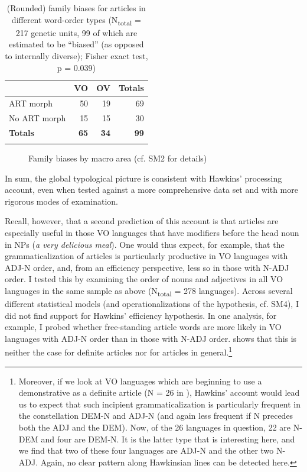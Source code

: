 \documentclass[output=paper]{langsci/langscibook}
\begin{document}
\begin{table}
\begin{tabularx}{\textwidth}{Xrrr}
\lsptoprule
& VO &   OV &   Totals\\
\midrule 
ART morph & 50 & 19 & 69\\
No ART morph & 15 & 15 & 30\\
\textbf{Totals} & \textbf{65} & \textbf{34} & \textbf{99}\\
\lspbottomrule
\end{tabularx} 
\caption{(Rounded) family biases for articles in different word-order types (N\textsubscript{total} = 217 genetic units, 99 of which are estimated to be “biased” (as opposed to internally diverse); Fisher exact test, p = 0.039)}
\label{tab:ksb:3}
\end{table}
   
 
\begin{figure}
\caption{Family biases by macro area (cf. SM2 for details)}
\label{fig:ksb:3}
\end{figure}

In sum, the global typological picture is consistent with Hawkins’ processing account, even when tested against a more comprehensive data set and with more rigorous modes of examination. 

Recall, however, that a second prediction of this account is that articles are especially useful in those VO languages that have modifiers before the head noun in NPs (\textit{a very delicious meal}). One would thus expect, for example, that the grammaticalization of articles is particularly productive in VO languages with ADJ-N order, and, from an efficiency perspective, less so in those with N-ADJ order. I tested this by examining the order of nouns and adjectives \citep{Dryer2013b} in all VO languages in the same sample as above (N\textsubscript{total} = 278 languages). Across several different statistical models (and operationalizations of the hypothesis, cf. SM4), I did not find support for Hawkins’ efficiency hypothesis. In one analysis, for example, I probed whether free-standing article words are more likely in VO languages with ADJ-N order than in those with N-ADJ order.  shows that this is neither the case for definite articles nor for articles in general.\footnote{Moreover, if we look at VO languages which are beginning to use a demonstrative as a definite article (N = 26 in \citealt{Dryer2013a}), Hawkins’ account would lead us to expect that such incipient grammaticalization is particularly frequent in the constellation DEM-N and ADJ-N (and again less frequent if N precedes both the ADJ and the DEM). Now, of the 26 languages in question, 22 are N-DEM and four are DEM-N. It is the latter type that is interesting here, and we find that two of these four languages are ADJ-N and the other two N-ADJ. Again, no clear pattern along Hawkinsian lines can be detected here.} 
\end{document}
